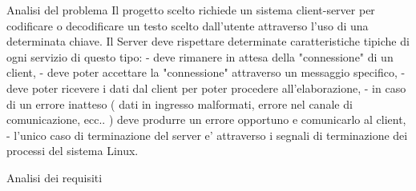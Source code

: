 Analisi del problema
Il progetto scelto richiede un sistema client-server per codificare o decodificare un testo scelto dall'utente attraverso l'uso di una determinata chiave. Il Server deve rispettare determinate caratteristiche tipiche di ogni servizio di questo tipo:
- deve rimanere in attesa della "connessione" di un client,
- deve poter accettare la "connessione" attraverso un messaggio specifico,
- deve poter ricevere i dati dal client per poter procedere all'elaborazione,
- in caso di un errore inatteso ( dati in ingresso malformati, errore nel canale di comunicazione, ecc.. ) deve produrre un errore opportuno e comunicarlo al client,
- l'unico caso di terminazione del server e' attraverso i segnali di terminazione dei processi del sistema Linux.


Analisi dei requisiti
